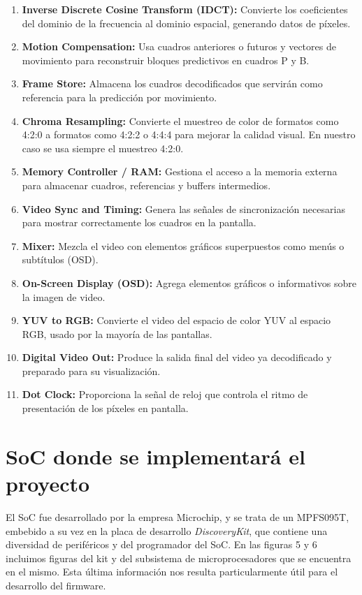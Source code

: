 \documentclass[conference]{IEEEtran}
\begin{document}
\begin{enumerate}
  \item \textbf{Inverse Discrete Cosine Transform (IDCT):} Convierte los coeficientes del dominio de la frecuencia al dominio espacial, generando datos de píxeles.

  \item \textbf{Motion Compensation:} Usa cuadros anteriores o futuros y vectores de movimiento para reconstruir bloques predictivos en cuadros P y B.

  \item \textbf{Frame Store:} Almacena los cuadros decodificados que servirán como referencia para la predicción por movimiento.

  \item \textbf{Chroma Resampling:} Convierte el muestreo de color de formatos como 4:2:0 a formatos como 4:2:2 o 4:4:4 para mejorar la calidad visual. En nuestro caso se usa siempre el muestreo 4:2:0.

  \item \textbf{Memory Controller / RAM:} Gestiona el acceso a la memoria externa para almacenar cuadros, referencias y buffers intermedios.

  \item \textbf{Video Sync and Timing:} Genera las señales de sincronización necesarias para mostrar correctamente los cuadros en la pantalla.

  \item \textbf{Mixer:} Mezcla el video con elementos gráficos superpuestos como menús o subtítulos (OSD).

  \item \textbf{On-Screen Display (OSD):} Agrega elementos gráficos o informativos sobre la imagen de video.

  \item \textbf{YUV to RGB:} Convierte el video del espacio de color YUV al espacio RGB, usado por la mayoría de las pantallas.

  \item \textbf{Digital Video Out:} Produce la salida final del video ya decodificado y preparado para su visualización.

  \item \textbf{Dot Clock:} Proporciona la señal de reloj que controla el ritmo de presentación de los píxeles en pantalla.
\end{enumerate}

\section{SoC donde se implementará el proyecto}
\label{sec:soc-donde-se}
El SoC fue desarrollado por la empresa Microchip\textregistered, y se trata de un MPFS095T, embebido a su vez en la placa de desarrollo \textit{Discovery\textregistered Kit}, que contiene una diversidad de periféricos y del programador del SoC. En las figuras 5 y 6 incluimos figuras del kit y del subsistema de microprocesadores que se encuentra en el mismo. Esta última información nos resulta particularmente útil para el desarrollo del firmware.
\end{document}
